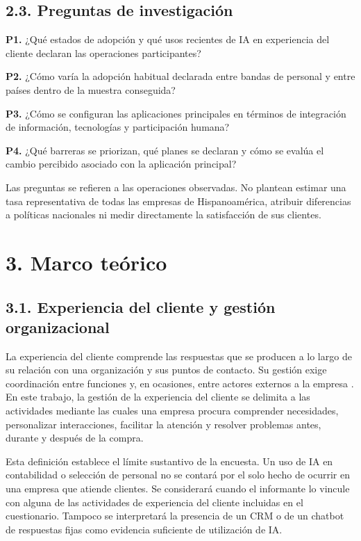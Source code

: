 \documentclass[12pt,letterpaper]{article}
\begin{document}
\subsection*{2.3. Preguntas de investigación}
\textbf{P1.} ¿Qué estados de adopción y qué usos recientes de IA en experiencia del cliente declaran las operaciones participantes?

\textbf{P2.} ¿Cómo varía la adopción habitual declarada entre bandas de personal y entre países dentro de la muestra conseguida?

\textbf{P3.} ¿Cómo se configuran las aplicaciones principales en términos de integración de información, tecnologías y participación humana?

\textbf{P4.} ¿Qué barreras se priorizan, qué planes se declaran y cómo se evalúa el cambio percibido asociado con la aplicación principal?

Las preguntas se refieren a las operaciones observadas. No plantean estimar una tasa representativa de todas las empresas de Hispanoamérica, atribuir diferencias a políticas nacionales ni medir directamente la satisfacción de sus clientes.

\section*{3. Marco teórico}
\subsection*{3.1. Experiencia del cliente y gestión organizacional}
La experiencia del cliente comprende las respuestas que se producen a lo largo de su relación con una organización y sus puntos de contacto. Su gestión exige coordinación entre funciones y, en ocasiones, entre actores externos a la empresa \citep{lemon}. En este trabajo, la gestión de la experiencia del cliente se delimita a las actividades mediante las cuales una empresa procura comprender necesidades, personalizar interacciones, facilitar la atención y resolver problemas antes, durante y después de la compra.

Esta definición establece el límite sustantivo de la encuesta. Un uso de IA en contabilidad o selección de personal no se contará por el solo hecho de ocurrir en una empresa que atiende clientes. Se considerará cuando el informante lo vincule con alguna de las actividades de experiencia del cliente incluidas en el cuestionario. Tampoco se interpretará la presencia de un CRM o de un chatbot de respuestas fijas como evidencia suficiente de utilización de IA.
\end{document}
